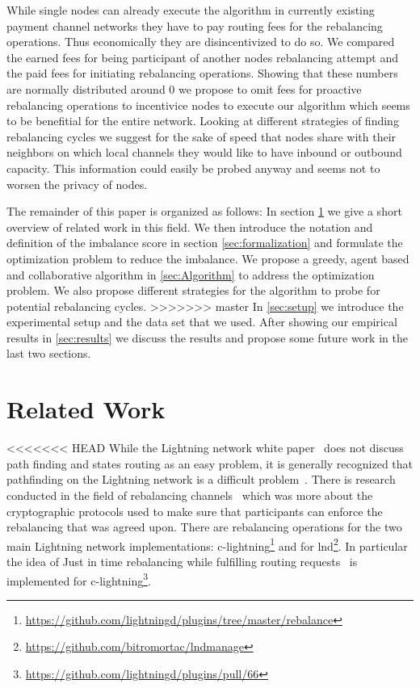 \documentclass[a4paper]{paper}
\begin{document}
While single nodes can already execute the algorithm in currently existing payment channel networks they have to pay routing fees for the rebalancing operations.
Thus economically they are disincentivized to do so.
We compared the earned fees for being participant of another nodes rebalancing attempt and the paid fees for initiating rebalancing operations.
Showing that these numbers are normally distributed around $0$ we propose to omit fees for proactive rebalancing operations to incentivice nodes to execute our algorithm which seems to be benefitial for the entire network. 
Looking at different strategies of finding rebalancing cycles we suggest for the sake of speed that nodes share with their neighbors on which local channels they would like to have inbound or outbound capacity.
This information could easily be probed anyway and seems not to worsen the privacy of nodes.

The remainder of this paper is organized as follows: In section \cref{sec:relatedWork} we give a short overview of related work in this field.
We then introduce the notation and definition of the imbalance score in section \cref{sec:formalization} and formulate the optimization problem to reduce the imbalance.
We propose a greedy, agent based and collaborative algorithm in \ref{sec:Algorithm} to address the optimization problem.
We also propose different strategies for the algorithm to probe for potential rebalancing cycles.
>>>>>>> master
In \cref{sec:setup} we introduce the experimental setup and the data set that we used.
After showing our empirical results in \cref{sec:results} we discuss the results and propose some future work in the last two sections.



\section{Related Work}
\label{sec:relatedWork}

<<<<<<< HEAD
While the Lightning network white paper~\cite{poon2016bitcoin} does not discuss path finding and states routing as an easy problem, it is generally recognized that pathfinding on the Lightning network is a difficult problem~\cite{piatkivskyi2018split, prihodko2016flare, bagaria2019boomerang, pickhardt2019pathfinding, grunspan2018ant, sivaraman2018routing}.
There is research conducted in the field of rebalancing channels~\cite{khalil2017revive} which was more about the cryptographic protocols used to make sure that participants can enforce the rebalancing that was agreed upon.
There are rebalancing operations for the two main Lightning network implementations: c-lightning\footnote{\url{https://github.com/lightningd/plugins/tree/master/rebalance}} and for lnd\footnote{\url{https://github.com/bitromortac/lndmanage}}.
In particular the idea of Just in time rebalancing while fulfilling routing requests~\cite{pickhardt2019jit} is implemented for c-lightning\footnote{\url{https://github.com/lightningd/plugins/pull/66}}. 
\end{document}
